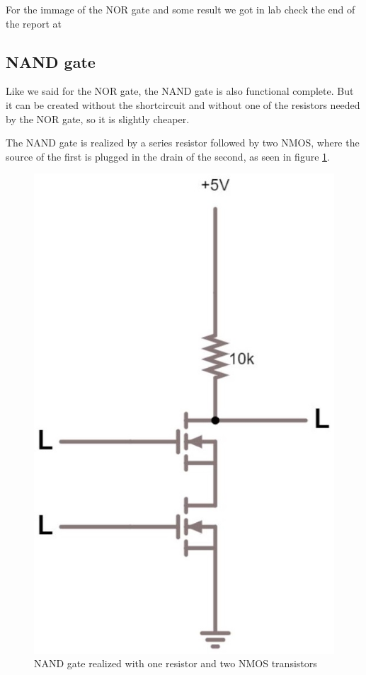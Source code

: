\documentclass{article}
\begin{document}
For the immage of the NOR gate and some result we got in lab check the end of the report at %

\subsection{NAND gate}

Like we said for the NOR gate, the NAND gate is also functional complete. But it can be created without the shortcircuit and without one of the resistors needed by the NOR gate, so it is slightly cheaper. 

\vspace{3mm}

The NAND gate is realized by a series resistor followed by two NMOS, where the source of the first is plugged in the drain of the second, as seen in figure \ref{NAND_NMOS}.

\begin{figure}[h]
    \centering
    \includegraphics[scale=.3]{IM_NAND_NMOS.JPG}
    \caption{NAND gate realized with one resistor and two NMOS transistors}
    \label{NAND_NMOS}
\end{figure}
\end{document}

